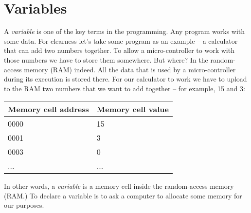 \documentclass[../sparc.tex]{subfiles}
\begin{document}
\section{Variables}

A \emph{variable} is one of the key terms in the programming.  Any program works
with some data.  For clearness let's take some program as an example -- a
calculator that can add two numbers together.  To allow a micro-controller to
work with those numbers we have to store them somewhere.  But where?  In the
random-access memory (RAM) indeed.  All the data that is used by a
micro-controller during its execution is stored there.  For our calculator to
work we have to upload to the RAM two numbers that we want to add together -- for
example, 15 and 3:

\begin{tabular}{p{4cm}|p{6cm}}
  Memory cell address & Memory cell value \\
  \hline \hline
  0000 & 15 \\
  \hline
  0001 & 3 \\
  \hline
  0003 & 0 \\
  ... & ... \\
\end{tabular}

In other words, a \emph{variable} is a memory cell inside the random-access
memory (RAM.)  To declare a variable is to ask a computer to allocate some
memory for our purposes.
\end{document}
